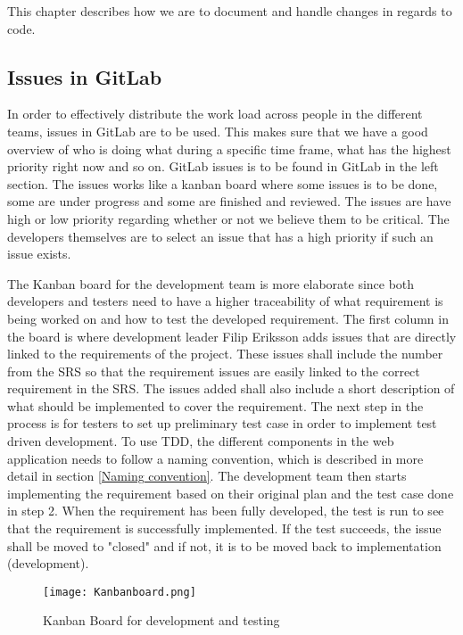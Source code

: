 This chapter describes how we are to document and handle changes in regards to code. 

\subsection{Issues in GitLab}
In order to effectively distribute the work load across people in the different teams, issues in GitLab are to be used. This makes sure that we have a good overview of who is doing what during a specific time frame, what has the highest priority right now and so on. GitLab issues is to be found in GitLab in the left section. The issues works like a kanban board where some issues is to be done, some are under progress and some are finished and reviewed. The issues are have high or low priority regarding whether or not we believe them to be critical. The developers themselves are to select an issue that has a high priority if such an issue exists. 

The Kanban board for the development team is more elaborate since both developers and testers need to have a higher traceability of what requirement is being worked on and how to test the developed requirement. The first column in the board is where development leader Filip Eriksson adds issues that are directly linked to the requirements of the project. These issues shall include the number from the SRS so that the requirement issues are easily linked to the correct requirement in the SRS. The issues added shall also include a short description of what should be implemented to cover the requirement. The next step in the process is for testers to set up preliminary test case in order to implement test driven development. To use TDD, the different components in the web application needs to follow a naming convention, which is described in more detail in section \ref{Naming convention}. The development team then starts implementing the requirement based on their original plan and the test case done in step 2. When the requirement has been fully developed, the test is run to see that the requirement is successfully implemented. If the test succeeds, the issue shall be moved to "closed" and if not, it is to be moved back to implementation (development).


\begin{figure}[hbt!]
\centering
\texttt{[image: Kanbanboard.png]}
\caption{Kanban Board for development and testing}
\label{fig:company structure}
\end{figure}


